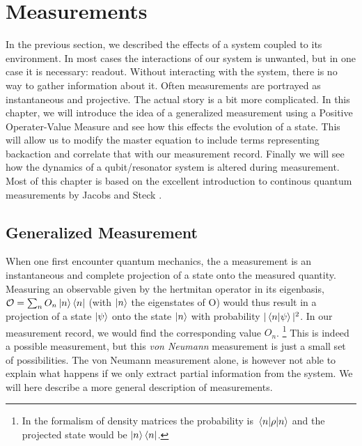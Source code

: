 \chapter{Measurements}\label{chap:measurements}
In the previous section, we described the effects of a system coupled to its environment. In most cases the interactions of our system is unwanted, but in one case it is necessary: readout. Without interacting with the system, there is no way to gather information about it. Often measurements are portrayed as instantaneous and projective. The actual story is a bit more complicated. In this chapter, we will introduce the idea of a generalized measurement using a Positive Operater-Value Measure and see how this effects the evolution of a state. This will allow us to modify the master equation to include terms representing backaction and correlate that with our measurement record. Finally we will see how the dynamics of a qubit/resonator system is altered during measurement. Most of this chapter is based on the excellent introduction to continous quantum measurements by Jacobs and Steck \cite{jacobs_straightforward_2006}.

\section{Generalized Measurement}
When one first encounter quantum mechanics, the a measurement is an instantaneous and complete projection of a state onto the measured quantity. Measuring an observable given by the hertmitan operator in its eigenbasis, $\mathcal{O} = \sum_n O_n \ket{n}\bra{n}$ (with $\ket{n}$ the eigenstates of O) would thus result in a projection of a state $\ket{\psi}$ onto the state $\ket{n}$ with probability $|\braket{n}{\psi}|^2$. In our measurement record, we would find the corresponding value $O_n$. \footnote[-1cm]{In the formalism of density matrices the probability is $\mel{n}{\rho}{n}$ and the projected state would be $\ket{n}\bra{n}$.} This is indeed a possible measurement, but this \textit{von Neumann} measurement is just a small set of possibilities. The von Neumann measurement alone, is however not able to explain what happens if we only extract partial information from the system. We will here describe a more general description of measurements. 

